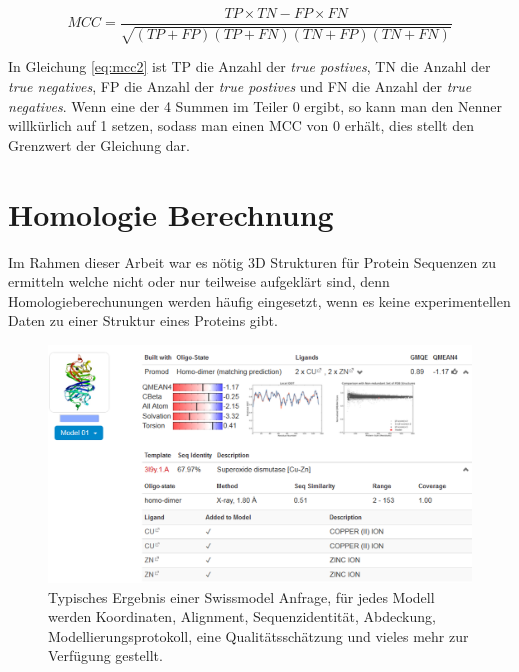 \begin{equation}
    MCC = \frac{TP \times TN - FP \times FN}{\sqrt{(TP + FP)(TP + FN)(TN + FP)(TN + FN)}}
    \label{eq:mcc2}
\end{equation}

In Gleichung \ref{eq:mcc2} ist TP die Anzahl der \emph{true postives}, TN die Anzahl der \emph{true negatives}, FP die Anzahl der \emph{true postives} und FN die Anzahl der \emph{true negatives}. Wenn eine der 4 Summen im Teiler 0 ergibt, so kann man den Nenner willkürlich auf 1 setzen, sodass man einen MCC von 0 erhält, dies stellt den Grenzwert der Gleichung dar.


\section{Homologie Berechnung}
\label{sec:siwssmodel}
Im Rahmen dieser Arbeit war es nötig 3D Strukturen für Protein Sequenzen zu ermitteln welche nicht oder nur teilweise aufgeklärt sind, denn Homologieberechunungen werden häufig eingesetzt, wenn es keine experimentellen Daten zu einer Struktur eines Proteins gibt. 
\begin{figure}
    \includegraphics[width=.95\textwidth]{images/Swissmodel.png}
    \caption{Typisches Ergebnis einer Swissmodel Anfrage, für jedes Modell werden Koordinaten, Alignment, Sequenzidentität, Abdeckung, Modellierungsprotokoll, eine Qualitätsschätzung und vieles mehr zur Verfügung gestellt.}
    \label{fig:swissmodel}
\end{figure}

